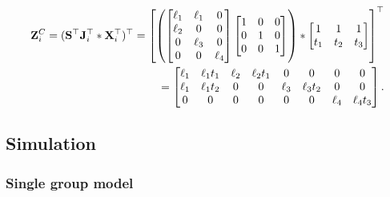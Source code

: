 \documentclass[12pt]{article}
\begin{document}
\begin{equation}
\begin{aligned}
{\mathbf Z}^{C}_{i} = ({\mathbf S}^{\top}{\mathbf J}^{\top}_{i} \ast {\mathbf X}^{\top}_{i})^{\top} =
\left[
\left(
\begin{bmatrix}
\ell_{1} & \ell_{1}  & 0 \\
\ell_{2} &  0  & 0 \\
0  &  \ell_{3} & 0 \\
0 & 0 &  \ell_{4} 
\end{bmatrix}
\begin{bmatrix}
1 & 0  & 0 \\
0 & 1  & 0 \\
0 & 0  & 1  
\end{bmatrix}
\right)
\ast
\begin{bmatrix}
1   & 1   & 1  \\ 
t_1 & t_2 & t_3
\end{bmatrix} 
\right]^{\top}
\\
= \begin{bmatrix}
\ell_{1} & \ell_{1}t_1 & \ell_{2} & \ell_{2}t_1 & 0 & 0 & 0 & 0 \\
\ell_{1} & \ell_{1}t_2 & 0 & 0 & \ell_{3} & \ell_{3}t_2 & 0 & 0 \\
0 & 0 & 0 & 0 & 0 & 0 & \ell_{4} & \ell_{4}t_3
\end{bmatrix}.
\end{aligned}
\end{equation}

\subsection*{Simulation}
\subsubsection*{Single group model}
\end{document}
